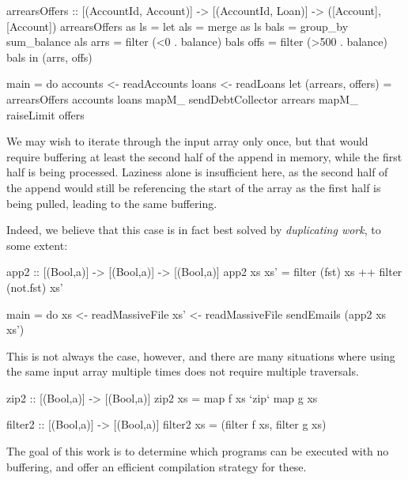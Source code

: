 \begin{code}
arrearsOffers
    :: [(AccountId, Account)]
    -> [(AccountId, Loan)]
    -> ([Account], [Account])
arrearsOffers as ls
 = let als  = merge as ls
       bals = group_by sum_balance als
       arrs = filter (<0   . balance) bals
       offs = filter (>500 . balance) bals
   in (arrs, offs)

main
 = do accounts <- readAccounts
      loans    <- readLoans
      let (arrears, offers)
                = arrearsOffers accounts loans
      mapM_ sendDebtCollector arrears
      mapM_ raiseLimit        offers
\end{code}

We may wish to iterate through the input array only once, but that would require buffering at least the second half of the append in memory, while the first half is being processed.
Laziness alone is insufficient here, as the second half of the append would still be referencing the start of the array as the first half is being pulled, leading to the same buffering.

Indeed, we believe that this case is in fact best solved by \emph{duplicating work}, to some extent:

\begin{code}
app2 :: [(Bool,a)] -> [(Bool,a)] -> [(Bool,a)]
app2 xs xs'
  = filter     (fst) xs
 ++ filter (not.fst) xs'

main
  = do xs  <- readMassiveFile
       xs' <- readMassiveFile
       sendEmails (app2 xs xs')
\end{code}

This is not always the case, however, and there are many situations where using the same input array multiple times does not require multiple traversals.

\begin{code}
zip2 :: [(Bool,a)] -> [(Bool,a)]
zip2 xs
  = map f xs `zip` map g xs

filter2 :: [(Bool,a)] -> [(Bool,a)]
filter2 xs
  = (filter f xs, filter g xs)
\end{code}
The goal of this work is to determine which programs can be executed with no buffering, and offer an efficient compilation strategy for these.



